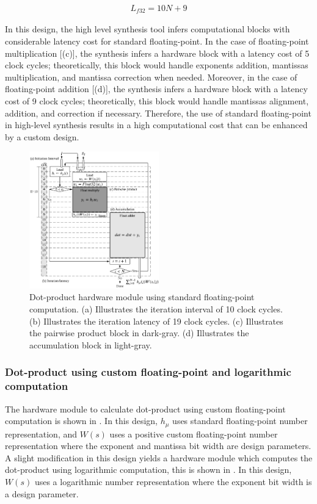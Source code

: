  \begin{eqnarray} \label{eq:dot_standard_float_latency}
 L_{f32}=10N+9
 \end{eqnarray}
 
In this design, the high level synthesis tool infers computational blocks with considerable latency cost for standard floating-point. In the case of floating-point multiplication [(c)], the synthesis infers a hardware block with a latency cost of 5 clock cycles; theoretically, this block would handle exponents addition, mantissas multiplication, and mantissa correction when needed. Moreover, in the case of floating-point addition [(d)], the synthesis infers a hardware block with a latency cost of 9 clock cycles; theoretically, this block would handle mantissas alignment, addition, and correction if necessary. Therefore, the use of standard floating-point in high-level synthesis results in a high computational cost that can be enhanced by a custom design.



\begin{figure}[t!]
	\centering
	\includegraphics[width=0.5\textwidth]{../figures/dot_product_float.pdf}
	\caption{Dot-product hardware module using standard floating-point computation. (a) Illustrates the iteration interval of 10 clock cycles. (b) Illustrates the iteration latency of 19 clock cycles. (c) Illustrates the pairwise product block in dark-gray. (d) Illustrates the accumulation block in light-gray.}
	\label{fig:dot_product_float}
\end{figure}

\subsubsection{Dot-product using custom floating-point and logarithmic computation}
 The hardware module to calculate dot-product using custom floating-point computation is shown in . In this design, $h_\mu$ uses standard floating-point number representation, and $W(s)$ uses a positive custom floating-point number representation where the exponent and mantissa bit width are design parameters. A slight modification in this design yields a hardware module which computes the dot-product using logarithmic computation, this is shown in . In this design, $W(s)$ uses a logarithmic number representation where the exponent bit width is a design parameter.
 
